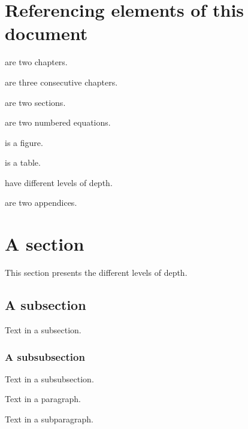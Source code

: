 \section{Referencing elements of this document}
\label{c3:s:referencing-elements-of-this-document}

 are two chapters.

 are three consecutive chapters.

 are two sections.

 are two numbered equations.

 is a figure.

 is a table.

 have different levels of depth.

 are two appendices.


\section{A section}
\label{c3:s:a-section}

This section presents the different levels of depth.


\subsection{A subsection}
\label{c3:ss:a-subsection}

Text in a subsection.


\subsubsection{A subsubsection}

Text in a subsubsection.



Text in a paragraph.



Text in a subparagraph.
